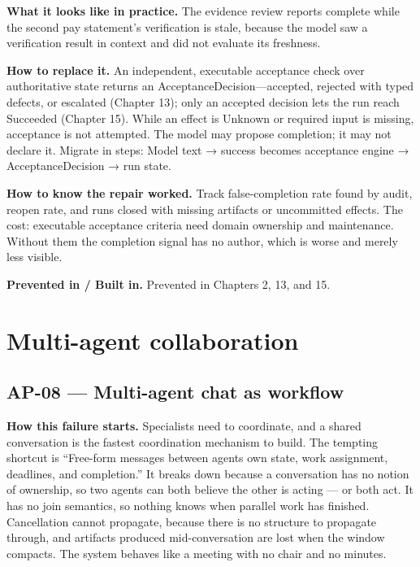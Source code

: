 \textbf{What it looks like in practice.} The evidence review reports complete while the second pay statement's verification is stale, because the model saw a verification result in context and did not evaluate its freshness.\par

\textbf{How to replace it.} An independent, executable acceptance check over authoritative state returns an AcceptanceDecision—accepted, rejected with typed defects, or escalated (Chapter 13); only an accepted decision lets the run reach Succeeded (Chapter 15). While an effect is Unknown or required input is missing, acceptance is not attempted. The model may propose completion; it may not declare it. Migrate in steps: Model text → success becomes acceptance engine → AcceptanceDecision → run state.\par

\textbf{How to know the repair worked.} Track false-completion rate found by audit, reopen rate, and runs closed with missing artifacts or uncommitted effects. The cost: executable acceptance criteria need domain ownership and maintenance. Without them the completion signal has no author, which is worse and merely less visible.\par

\textbf{Prevented in / Built in.} Prevented in Chapters 2, 13, and 15.\par

\section{Multi-agent collaboration}

\subsection{AP-08 — Multi-agent chat as workflow}

\textbf{How this failure starts.} Specialists need to coordinate, and a shared conversation is the fastest coordination mechanism to build. The tempting shortcut is “Free-form messages between agents own state, work assignment, deadlines, and completion.” It breaks down because a conversation has no notion of ownership, so two agents can both believe the other is acting — or both act. It has no join semantics, so nothing knows when parallel work has finished. Cancellation cannot propagate, because there is no structure to propagate through, and artifacts produced mid-conversation are lost when the window compacts. The system behaves like a meeting with no chair and no minutes.\par

